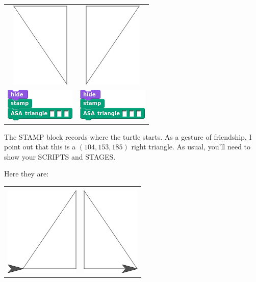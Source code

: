 \documentclass[noauthor,nooutcomes,12pt,hints,handout]{ximera}
\begin{document}
\begin{question}
\begin{center}
\begin{tabular}{|c||c|}
      \includegraphics{EgStageIII.png} & \includegraphics{EgStageIV.png} \\
      \includegraphics{ASAstampBlank.png} & \includegraphics{ASAstampBlank.png} \\\hline
    \end{tabular}
  \end{center}
  The STAMP block records where the turtle starts. As a gesture of
  friendship, I point out that this is a $(104, 153, 185)$ right
  triangle. As usual, you'll need to show your SCRIPTS and STAGES.
  \begin{freeResponse}
    Here they are:
    \begin{center}
    \begin{tabular}{|c||c|}\hline
      &  \\
      \includegraphics{stampStageII.png} & \includegraphics{stampStageI.png} \\

\end{tabular}
\end{center}
\end{freeResponse}
\end{question}
\end{document}
